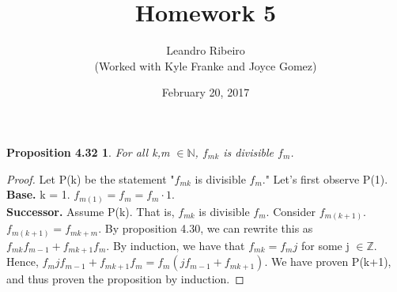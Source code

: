 \documentclass[12pt]{amsart}
\newcommand{\N}{\mathbb{N}}
\newcommand{\Z}{\mathbb{Z}}
\begin{document}
\title{Homework 5}
\date{February 20, 2017}
\author{Leandro Ribeiro\\(Worked with Kyle Franke and Joyce Gomez)}

\maketitle

\newtheorem*{prop4.32}{Proposition 4.32}
\begin{prop4.32}
	For all k,m $\in \N$, $f_{mk}$ is divisible $f_{m}$.
\end{prop4.32}

\begin{proof}
	Let P(k) be the statement "$f_{mk}$ is divisible $f_{m}$." Let's first observe P(1).
	\\\textbf{Base.} k = 1. $f_{m(1)} = f_{m} = f_{m} \cdot 1$.
	\\\textbf{Successor.} Assume P(k). That is, $f_{mk}$ is divisible $f_{m}$. Consider $f_{m(k+1)}$. $f_{m(k+1)} = f_{mk + m}$. By proposition 4.30, we can rewrite this as $f_{mk}f_{m-1} + f_{mk+1}f_{m}$. By induction, we have that $f_{mk} = f_{m}j$ for some j $\in \Z$. Hence, $f_{m}jf_{m-1} + f_{mk+1}f_{m} = f_{m}(jf_{m-1} + f_{mk+1})$. We have proven P(k+1), and thus proven the proposition by induction.
\end{proof}
\end{document}

